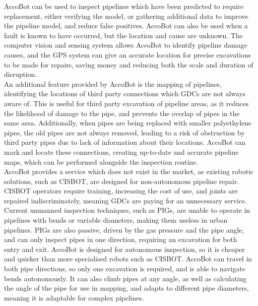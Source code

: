 \documentclass[11pt]{article}		%
\begin{document}
		AccoBot can be used to inspect pipelines which have been predicted to require replacement, either verifying the model, or gathering additional data to improve the pipeline model, and reduce false positives.
		AccoBot can also be used when a fault is known to have occurred, but the location and cause are unknown.
		The computer vision and sensing system allows AccoBot to identify pipeline damage causes, and the GPS system can give an accurate location for precise excavations to be made for repairs, saving money and reducing both the scale and duration of disruption.
		\\
        \hspace*{2ex}An additional feature provided by AccoBot is the mapping of pipelines, identifying the locations of third party connections which GDCs are not always aware of.
		This is useful for third party excavation of pipeline areas, as it reduces the likelihood of damage to the pipe, and prevents the overlap of pipes in the same area.
		Additionally, when pipes are being replaced with smaller polyethylene pipes, the old pipes are not always removed, leading to a risk of obstruction by third party pipes due to lack of information about their locations.
		AccoBot can mark and locate these connections, creating up-to-date and accurate pipeline maps, which can be performed alongside the inspection routine.
		\\
        \hspace*{2ex}AccoBot provides a service which does not exist in the market, as existing robotic solutions, such as CISBOT, are designed for non-autonomous pipeline repair.
		CISBOT operators require training, increasing the cost of use, and joints are repaired indiscriminately, meaning GDCs are paying for an unnecessary service.
		Current unmanned inspection techniques, such as PIGs, are unable to operate in pipelines with bends or variable diameters, making them useless in urban pipelines.
		PIGs are also passive, driven by the gas pressure and the pipe angle, and can only inspect pipes in one direction, requiring an excavation for both entry and exit.
		AccoBot is designed for autonomous inspection, so it is cheaper and quicker than more specialised robots such as CISBOT.
		AccoBot can travel in both pipe directions, so only one excavation is required, and is able to navigate bends autonomously.
		It can also climb pipes at any angle, as well as calculating the angle of the pipe for use in mapping, and adapts to different pipe diameters, meaning it is adaptable for complex pipelines.
				
\end{document}
